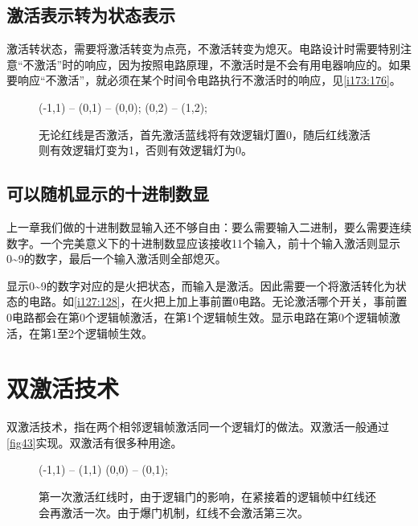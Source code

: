 \subsection{激活表示转为状态表示}

激活转状态，需要将激活转变为点亮，不激活转变为熄灭。电路设计时需要特别注意“不激活”时的响应，因为按照电路原理，不激活时是不会有用电器响应的。如果要响应“不激活”，就必须在某个时间令电路执行不激活时的响应，见\autoref{i173:176}。

\begin{figure}[!ht]
  \centering
  \begin{tikzpictureC}[TRsch]
     (-1,1) -- (0,1) -- (0,0);
     (0,2) -- (1,2);
  \end{tikzpictureC}
  \caption{无论红线是否激活，首先激活蓝线将有效逻辑灯置0，随后红线激活则有效逻辑灯变为1，否则有效逻辑灯为0。}
  \label{i173:176}
\end{figure}

\subsection{可以随机显示的十进制数显}

上一章我们做的十进制数显输入还不够自由：要么需要输入二进制，要么需要连续数字。一个完美意义下的十进制数显应该接收11个输入，前十个输入激活则显示0\~{}9的数字，最后一个输入激活则全部熄灭。

显示0\~{}9的数字对应的是火把状态，而输入是激活。因此需要一个将激活转化为状态的电路。如\autoref{i127:128}，在火把上加上事前置0电路。无论激活哪个开关，事前置0电路都会在第0个逻辑帧激活，在第1个逻辑帧生效。显示电路在第0个逻辑帧激活，在第1至2个逻辑帧生效。

\begin{figure}[!ht]
  \centering
  \caption{}
  \label{i127:128}
\end{figure}

\section{双激活技术}\label{sec33}
双激活技术，指在两个相邻逻辑帧激活同一个逻辑灯的做法。双激活一般通过\autoref{fig43}实现。双激活有很多种用途。
\begin{figure}[!ht]
  \centering
  \begin{tikzpictureC}[TRsch]
      (-1,1) -- (1,1)
      (0,0) -- (0,1);
  \end{tikzpictureC}
  \caption{第一次激活红线时，由于逻辑门的影响，在紧接着的逻辑帧中红线还会再激活一次。由于爆门机制，红线不会激活第三次。}\label{fig43}
\end{figure}

